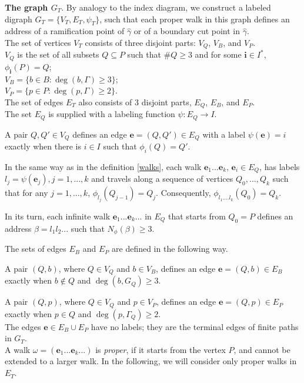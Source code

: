 \documentclass[11pt,reqno]{amsart}
\newcommand{\be}{{\bm e}}
\newcommand{\bi}{{\bm i}}
\newcommand{\IN}{{\subseteq}}
\newcommand{\Ga}{{\Gamma}}
\newcommand{\hga}{{\hat\gamma}}
\newcommand{\Nfi}{{N_\phi}}
\begin{document}
{\bf The graph $G_T$}. By analogy to the index diagram, we construct a labeled digraph $G_T=\{ V_T, E_T, \psi_T\}$,  such that each proper walk in this graph defines an address of a ramification point of $\hga$ or of a  boundary cut point in  $\hga$.\\


 The set of vertices  $V_T$ consists of three disjoint parts: $V_Q$,  
 $V_B$, and $V_P$. \\
 $V_Q$ is the set of all subsets
$Q\IN P$  such that  $\#Q\ge 3$ and for some $\bi\in I^*$, $\phi_\bi(P)=Q$; \\
$V_B=\{b\in B: \deg(b, \Gamma) \ge  3\}$;\\
$V_P=\{p\in P: \deg(p, \Gamma) \ge  2\}$. 
\\

The set of edges $E_T$ also consists of 3 disjoint parts, $E_Q$, $E_B$, and $E_P$.\\
The set $E_Q$ is supplied with a labeling function $\psi:E_Q\to I$.

A pair $Q,Q'\in V_Q$ defines  an edge $\be=(Q,Q')\in E_Q$ with a label $\psi(\be)=i$ exactly when there is $i\in I$ such that $\phi_i(Q)=Q'$. 

In the same way as in  the definition \ref{walks}, each walk $\be_1...\be_k$, $\be_i\in E_Q$,   has labels $l_j=\psi(\be_j),j=1,...,k$ and travels along a sequence  of vertices
 $Q_0,...,Q_k$ such that for any  $j=1,...,k$, 
 $\phi_{l_j}(Q_{j-1})=Q_j$. Consequently,  $\phi_{l_1....l_k}(Q_0)=Q_k$.
 
 In its turn, each infinite walk $\be_1...\be_k...$ in $E_Q$ that starts from $Q_0=P$ defines an address ${\beta }=l_1l_2...$ such that $\Nfi(\beta)\ge 3$.

 The sets of edges $E_B$ and $E_P$  are defined in the following way.
 
A pair $(Q,b)$, where $Q\in V_Q$ and $b\in V_B$, defines an edge $\be=(Q,b)\in E_B$ exactly when $b\notin Q$ and $\deg(b,G_Q)\ge 3$.

A pair $(Q,p)$, where $Q\in V_Q$ and $p\in V_P$, defines an edge $\be=(Q,p)\in E_P$ exactly when $p\in Q$ and $\deg(p,\Ga_Q)\ge 2$.\\
The edges $\be\in E_B\cup E_P$ have no labels;  they are the terminal edges  of finite paths in $G_T$.\\

A walk $\omega=(\be_1...\be_k...)$ is {\em proper}, if it starts from the vertex $P$, and cannot be extended to a larger walk.
In the following, we will consider only proper walks in $E_T$.
\end{document}
